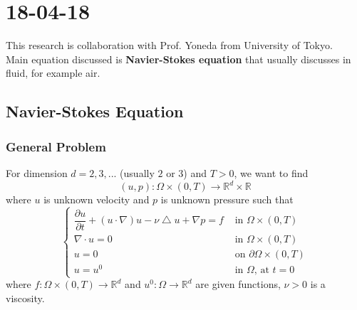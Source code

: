 \documentclass[a4paper,10pt]{article}
\newcommand{\R}{\mathbb{R}}
\begin{document}
\section{18-04-18}
This research is collaboration with Prof. Yoneda from University of Tokyo.\\
Main equation discussed is \textbf{Navier-Stokes equation} that usually discusses in fluid, for example air.

\subsection{Navier-Stokes Equation}

\subsubsection{General Problem}
For dimension $ d=2,3,... $ (usually $ 2 $ or $ 3 $) and $ T>0 $, we want to find \[(u,p) : \Omega \times (0,T) \rightarrow \R^d \times \R\] where $ u $ is unknown velocity and $ p $ is unknown pressure such that
\begin{equation}\label{Navier-Stokes}
\begin{cases}
\dfrac{\partial u}{\partial t} + (u \cdot \nabla) u - \nu \bigtriangleup u + \nabla p = f & \text{ in } \Omega \times (0,T)\\
\nabla \cdot u = 0 & \text{ in } \Omega \times (0,T)\\
u = 0 & \text{ on } \partial \Omega \times (0,T)\\
u = u^0 & \text{ in } \Omega \text{, at } t=0
\end{cases}
\end{equation}
where $ f : \Omega \times (0,T) \rightarrow \R^d $ and $ u^0 : \Omega \rightarrow \R^d $ are given functions, $ \nu > 0 $ is a viscosity.
\end{document}
